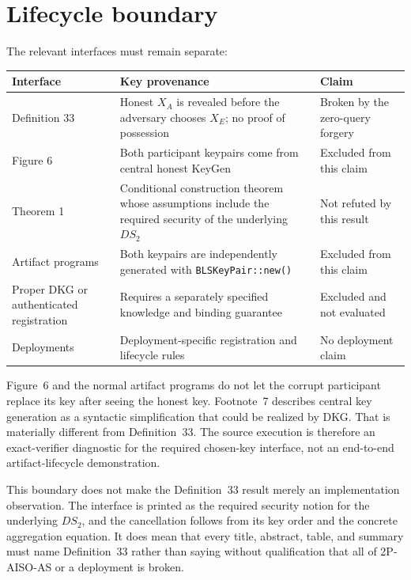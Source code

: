 \documentclass[10pt,a4paper]{article}
\begin{document}
\section{Lifecycle boundary}

The relevant interfaces must remain separate:

\begin{center}
\begin{tabularx}{\textwidth}{@{}p{}p{}X@{}}
\toprule
Interface & Key provenance & Claim \\
\midrule
Definition 33 & Honest $X_A$ is revealed before the adversary chooses
$X_E$; no proof of possession & Broken by the zero-query forgery \\
Figure 6 & Both participant keypairs come from central honest
\textsf{KeyGen} & Excluded from this claim \\
Theorem 1 & Conditional construction theorem whose assumptions include the
required security of the underlying $DS_2$ & Not refuted by this result \\
Artifact programs & Both keypairs are independently generated with
\texttt{BLSKeyPair::new()} & Excluded from this claim \\
Proper DKG or authenticated registration & Requires a separately specified
knowledge and binding guarantee & Excluded and not evaluated \\
Deployments & Deployment-specific registration and lifecycle rules & No
deployment claim \\
\bottomrule
\end{tabularx}
\end{center}

Figure~6 and the normal artifact programs do not let the corrupt participant
replace its key after seeing the honest key. Footnote~7 describes central key
generation as a syntactic simplification that could be realized by DKG. That
is materially different from Definition~33. The source execution is therefore
an exact-verifier diagnostic for the required chosen-key interface, not an
end-to-end artifact-lifecycle demonstration.

This boundary does not make the Definition~33 result merely an implementation
observation. The interface is printed as the required security notion for the
underlying $DS_2$, and the cancellation follows from its key order and the
concrete aggregation equation. It does mean that every title, abstract, table,
and summary must name Definition~33 rather than saying without qualification
that all of 2P-AISO-AS or a deployment is broken.
\end{document}
